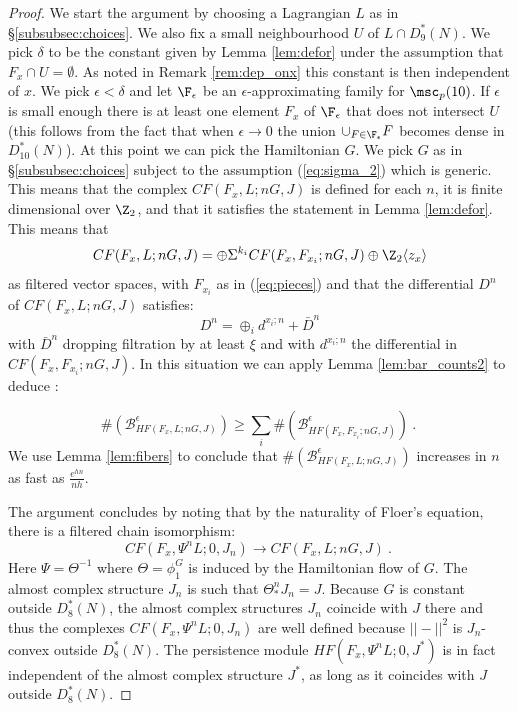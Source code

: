 %
\begin{proof}
We start the argument by choosing a Lagrangian $L$ as in \S\ref{subsubsec:choices}.  We also fix a small neighbourhood $U$ of $L\cap D_{9}^{\ast}(N)$. We pick $\delta$ to be the constant given by Lemma \ref{lem:defor} under the assumption that $F_{x}\cap U=\emptyset$.
As noted in Remark \ref{rem:dep_onx} this constant is then independent 
of $x$. We pick $\epsilon < \delta$ and let $\F_{\epsilon}$ be an $\epsilon$-approximating family for $\msc_{p}(10)$. If $\epsilon$ is small enough there is 
at least one element $F_{x}$ of $\F_{\epsilon}$ that does not intersect $U$ (this follows from the fact that when $\epsilon\to 0$ the union $\cup_{F\in \F_{\epsilon}}F$ becomes dense in $D^{\ast}_{10}(N)$).
At this point we can pick the Hamiltonian $G$. We pick $G$ as in \S\ref{subsubsec:choices} subject to the assumption (\ref{eq:sigma_2}) which is generic.  This means that the complex $CF(F_{x}, L; nG, J)$ is defined for 
each $n$, it is finite dimensional over $\Z_{2}$, and that it satisfies the statement 
in Lemma \ref{lem:defor}.
This means that 
$$CF(F_{x},L;nG,J)=\oplus \Sigma^{k_{i}}CF(F_{x},F_{x_{i}};nG,J)\oplus \Z_2 \langle z_{x}\rangle $$
as filtered vector spaces, with $F_{x_{i}}$ as in (\ref{eq:pieces}) and 
that the differential $D^{n}$ of $CF(F_{x},L;nG,J)$ satisfies:
$$D^{n}=\oplus_{i}d^{x_{i};n}+\bar{D}^{n}$$ with 
$\bar{D}^{n}$ dropping filtration by at least $\xi$ and with $d^{x_{i};n}$ the differential in $CF(F_{x},F_{x_{i}};nG,J)$. 
In this situation we can  apply Lemma \ref{lem:bar_counts2}
to deduce :

$$\# (\mathcal{B}^{\epsilon}_{HF(F_{x},L;nG,J) })\geq  \sum_{i}\# (\mathcal{B}^{\epsilon}_{HF(F_{x},F_{x_{i}};nG,J)})~.~$$
We use  Lemma \ref{lem:fibers} to conclude that
$\# (\mathcal{B}^{\epsilon}_{HF(F_{x},L;nG,J) })$ increases in $n$ as fast 
as $\frac{e^{hn}}{nh}$.

The argument concludes by noting that by the naturality of Floer's equation, there is a filtered chain isomorphism:
$$CF(F_{x}, \Psi^{n} L; 0, J_{n})\to CF(F_{x},L;nG, J)~.~$$ 
Here $\Psi = \Theta^{-1}$ where $\Theta=\phi_{1}^{G}$ is induced by the Hamiltonian flow of $G$. The almost complex structure
$J_{n}$ is such that $\Theta^{n}_{\ast}J_{n}=J$. Because $G$ is constant outside 
$D^{\ast}_{8}(N)$, the almost complex structures $J_{n}$ coincide with $J$ there and thus the complexes $CF(F_{x}, \Psi^{n} L; 0, J_{n})$ are well defined
because $|| - ||^{2}$  is  $J_{n}$- convex outside $D^{\ast}_{8}(N)$. The persistence
module $HF(F_{x}, \Psi^{n} L; 0, J^{*})$ is in fact independent of the almost complex structure $J^{\ast}$, as long as it coincides with $J$ outside $D^{\ast}_{8}(N)$.

\end{proof}

